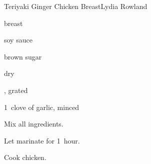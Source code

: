 \begin{recipe}{Teriyaki Ginger Chicken Breast}{Lydia Rowland}{}

\begin{ingredients}
\item {}  breast
\item {} soy sauce
\item {} brown sugar
\item {} dry 
\item \tp{\half} , grated
\item 1~clove of garlic, minced
\end{ingredients}

\begin{directions}
\item Mix all ingredients.
\item Let marinate for 1~hour.
\item Cook chicken.
\end{directions}

\end{recipe}
